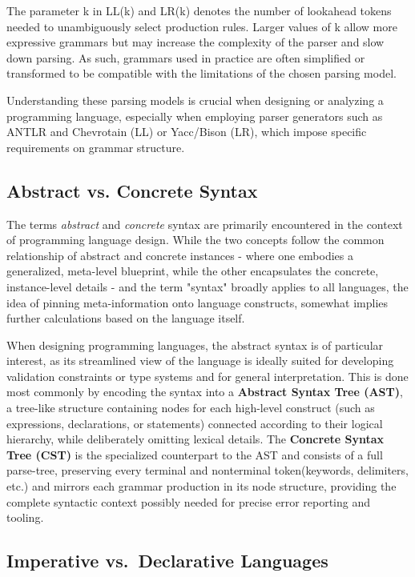 The parameter k in LL(k) and LR(k) denotes the number of lookahead tokens needed to unambiguously select production rules.
Larger values of k allow more expressive grammars but may increase the complexity of the parser and slow down parsing.
As such, grammars used in practice are often simplified or transformed to be compatible with the limitations of the chosen parsing model.

Understanding these parsing models is crucial when designing or analyzing a programming language, especially when employing parser generators such as
ANTLR and Chevrotain (LL) or Yacc/Bison (LR), which impose specific requirements on grammar structure.

\subsection{Abstract vs. Concrete Syntax}

The terms \textit{abstract} and \textit{concrete} syntax are primarily encountered in the context of programming language design. While the two concepts follow the common relationship of
abstract and concrete instances - where one embodies a generalized, meta-level blueprint, while the other encapsulates the concrete, instance-level details - and the term "syntax" broadly applies to all languages,
the idea of pinning meta-information onto language constructs, somewhat implies further calculations based on the language itself.

When designing programming languages, the abstract syntax is of particular interest, as its streamlined view of the language is ideally suited for developing
validation constraints or type systems and for general interpretation. This is done most commonly by encoding the syntax into a \textbf{Abstract Syntax Tree (AST)},
a tree-like structure containing nodes for each high-level construct (such as expressions, declarations, or statements) connected according to their logical hierarchy,
while deliberately omitting lexical details. \cite{slonneger1995specifying}
The \textbf{Concrete Syntax Tree (CST)} is the specialized counterpart to the AST and consists of a full parse-tree, preserving every terminal and nonterminal
token(keywords, delimiters, etc.) and mirrors each grammar production in its node structure, providing the complete syntactic context possibly needed for precise error
reporting and tooling. \cite{aho2006compilers}

\label{sec:prog-paradigms}
\subsection{Imperative vs.\ Declarative Languages}

